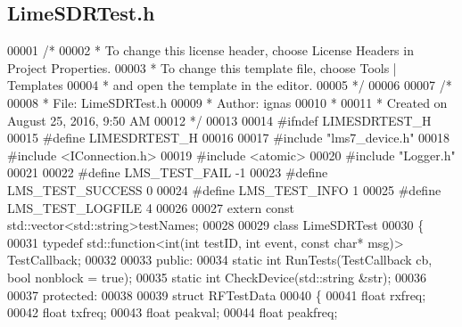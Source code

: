 \subsection{Lime\+S\+D\+R\+Test.\+h}
\label{LimeSDRTest_8h_source}

\begin{DoxyCode}
00001 \textcolor{comment}{/*}
00002 \textcolor{comment}{ * To change this license header, choose License Headers in Project Properties.}
00003 \textcolor{comment}{ * To change this template file, choose Tools | Templates}
00004 \textcolor{comment}{ * and open the template in the editor.}
00005 \textcolor{comment}{ */}
00006 
00007 \textcolor{comment}{/*}
00008 \textcolor{comment}{ * File:   LimeSDRTest.h}
00009 \textcolor{comment}{ * Author: ignas}
00010 \textcolor{comment}{ *}
00011 \textcolor{comment}{ * Created on August 25, 2016, 9:50 AM}
00012 \textcolor{comment}{ */}
00013 
00014 \textcolor{preprocessor}{#ifndef LIMESDRTEST\_H}
00015 \textcolor{preprocessor}{#define LIMESDRTEST\_H}
00016 
00017 \textcolor{preprocessor}{#include "lms7_device.h"}
00018 \textcolor{preprocessor}{#include <IConnection.h>}
00019 \textcolor{preprocessor}{#include <atomic>}
00020 \textcolor{preprocessor}{#include "Logger.h"}
00021 
00022 \textcolor{preprocessor}{#define LMS\_TEST\_FAIL       -1}
00023 \textcolor{preprocessor}{#define LMS\_TEST\_SUCCESS    0}
00024 \textcolor{preprocessor}{#define LMS\_TEST\_INFO       1}
00025 \textcolor{preprocessor}{#define LMS\_TEST\_LOGFILE    4}
00026 
00027 \textcolor{keyword}{extern} \textcolor{keyword}{const} std::vector<std::string>testNames;
00028 
00029 \textcolor{keyword}{class }LimeSDRTest
00030 \{
00031     \textcolor{keyword}{typedef} std::function<int(int testID, int event, const char* msg)> 
      TestCallback;
00032 
00033 \textcolor{keyword}{public}:
00034     \textcolor{keyword}{static} \textcolor{keywordtype}{int} RunTests(TestCallback cb, \textcolor{keywordtype}{bool} nonblock = \textcolor{keyword}{true});
00035     \textcolor{keyword}{static} \textcolor{keywordtype}{int} CheckDevice(std::string &str);
00036     
00037 \textcolor{keyword}{protected}:
00038     
00039     \textcolor{keyword}{struct }RFTestData
00040     \{
00041         \textcolor{keywordtype}{float} rxfreq;
00042         \textcolor{keywordtype}{float} txfreq;
00043         \textcolor{keywordtype}{float} peakval;
00044         \textcolor{keywordtype}{float} peakfreq;

\end{DoxyCode}
